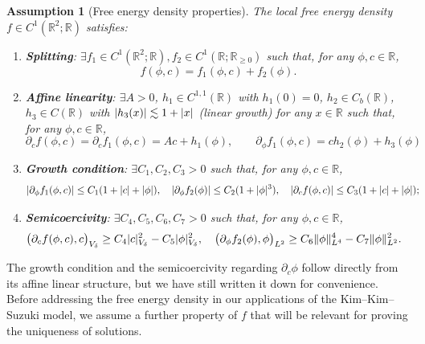 \documentclass[]{article}
\newtheorem{assumption}{Assumption}
\newcommand{\R}{\mathbb{R}}
\newcommand{\eps}{\varepsilon}
\DeclarePairedDelimiter{\abs}{\lvert}{\rvert}
\DeclarePairedDelimiter{\norm}{\lVert}{\rVert}
\begin{document}
\begin{assumption}[Free energy density properties] \label{assump:free_energy_density}
The local free energy density $f\in C^{1}(\mathbb{R}^2;\R)$ satisfies:\\[-0.5em]
\begin{enumerate}[label=\textup{(F\arabic*)}, ref=F\arabic*, leftmargin=.9cm]  
	\item \label{assump:splitting} \textbf{Splitting}: $\exists f_1 \in C^{1}(\mathbb{R}^2;\R), f_2 \in C^{1}(\mathbb{R};\R_{\geq 0})$ such that, for any $\phi,c \in \R$,
	$$f(\phi,c)=f_1(\phi,c)+f_2(\phi).$$
	\item \label{assump:affine} \textbf{Affine linearity}: $\exists A>0$, $h_1 \in C^{1,1}(\R)$ with $h_1(0)=0$, $h_2 \in C_b(\R)$, $h_3 \in C(\R)$ with $|h_3(x)| \lesssim 1+\abs{x}$ (linear growth) for any $x\in\R$ such that, for any $\phi,c \in \R$, 
	$$\partial_c f(\phi,c)=\partial_c f_1(\phi,c)=Ac+h_1(\phi), \qquad \partial_\phi f_1(\phi,c)=ch_2(\phi)+h_3(\phi)$$
	\item \label{assump:growth} \textbf{Growth condition}: $\exists C_1,C_2,C_3>0$ such that, for any $\phi,c \in \R$,
	$$\begin{aligned}
		|\partial_\phi f_1(\phi,c)| &\leq C_1 (1+\abs{c}+\abs{\phi}), \quad |\partial_\phi f_2(\phi)| \leq C_2 (1+\abs{\phi}^3), \quad
		|\partial_c f(\phi,c)| \leq C_3 (1+\abs{c}+\abs{\phi});
	\end{aligned}$$
	\item \label{assump:semi} \textbf{Semicoercivity}: $\exists C_4,C_5,C_6,C_7>0$ such that, for any $\phi,c \in \R$,
	$$
	\begin{aligned}
		\bigl(\partial_c f(\phi,c), c \bigr)_{V_\delta} &\geq C_4 \abs{c}_{{V_\delta}}^{2} - C_5 \abs{\phi}_{{V_\delta}}^2, \quad
		\bigl(\partial_\phi f_2(\phi), \phi \bigr)_{L^2} \geq C_6 \norm{\phi}_{L^4}^4 - C_7 \norm{\phi}_{L^2}^2. %
	\end{aligned}
	$$
\end{enumerate}
\end{assumption}
The growth condition and the semicoercivity regarding $\partial_c \phi$ follow directly from its affine linear structure, but we have still written it down for convenience.
Before addressing the free energy density in our applications of the Kim--Kim--Suzuki model, we assume a further property of $f$ that will be relevant for proving the uniqueness of solutions.
\end{document}
